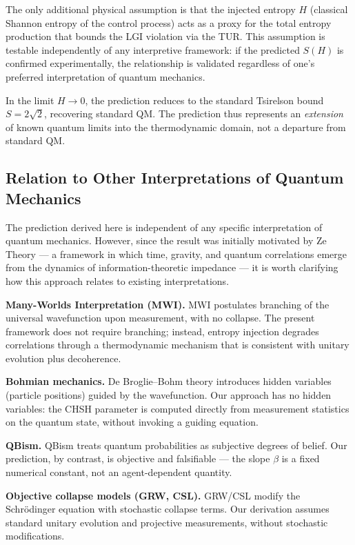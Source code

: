 \documentclass[a4paper]{quantumarticle}
\begin{document}
The only additional physical assumption is that the injected entropy $H$ (classical Shannon entropy of the control process) acts as a proxy for the total entropy production that bounds the LGI violation via the TUR. This assumption is testable independently of any interpretive framework: if the predicted $S(H)$ is confirmed experimentally, the relationship is validated regardless of one's preferred interpretation of quantum mechanics.

In the limit $H \to 0$, the prediction reduces to the standard Tsirelson bound $S = 2\sqrt{2}$, recovering standard QM. The prediction thus represents an \emph{extension} of known quantum limits into the thermodynamic domain, not a departure from standard QM.

\subsection{Relation to Other Interpretations of Quantum Mechanics}

The prediction derived here is independent of any specific interpretation of quantum mechanics. However, since the result was initially motivated by Ze Theory \cite{tkemaladze2026ze} --- a framework in which time, gravity, and quantum correlations emerge from the dynamics of information-theoretic impedance --- it is worth clarifying how this approach relates to existing interpretations.

\textbf{Many-Worlds Interpretation (MWI).} MWI postulates branching of the universal wavefunction upon measurement, with no collapse. The present framework does not require branching; instead, entropy injection degrades correlations through a thermodynamic mechanism that is consistent with unitary evolution plus decoherence.

\textbf{Bohmian mechanics.} De Broglie--Bohm theory introduces hidden variables (particle positions) guided by the wavefunction. Our approach has no hidden variables: the CHSH parameter is computed directly from measurement statistics on the quantum state, without invoking a guiding equation.

\textbf{QBism.} QBism treats quantum probabilities as subjective degrees of belief. Our prediction, by contrast, is objective and falsifiable --- the slope $\beta$ is a fixed numerical constant, not an agent-dependent quantity.

\textbf{Objective collapse models (GRW, CSL).} GRW/CSL modify the Schr\"{o}dinger equation with stochastic collapse terms. Our derivation assumes standard unitary evolution and projective measurements, without stochastic modifications.
\end{document}
